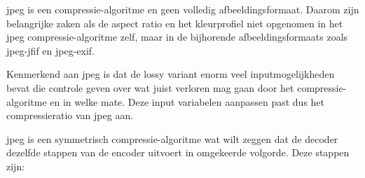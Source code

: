 \Gls{jpeg} is een \gls{compressie-algoritme} en geen volledig \gls{afbeeldingsformaat}. Daarom zijn belangrijke zaken als de aspect ratio en het kleurprofiel niet opgenomen in het \gls{jpeg} \gls{compressie-algoritme} zelf, maar in de bijhorende \glspl{afbeeldingsformaat} zoals \gls{jpeg-jfif} en \gls{jpeg-exif}. 

Kenmerkend aan \gls{jpeg} is dat de \gls{lossy} variant enorm veel inputmogelijkheden bevat die controle geven over wat juist verloren mag gaan door het \gls{compressie-algoritme} en in welke mate. Deze input variabelen aanpassen past dus het \gls{compressieratio} van \gls{jpeg} aan.

\Gls{jpeg} is een symmetrisch \gls{compressie-algoritme} wat wilt zeggen dat de \gls{decoder} dezelfde stappen van de \gls{encoder} uitvoert in omgekeerde volgorde. Deze stappen zijn:

